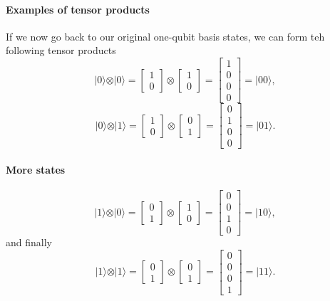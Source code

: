\paragraph{Examples of tensor products}
If we now go back to our original one-qubit basis states, we can form teh following tensor products
\[
\vert 0 \rangle \otimes \vert 0 \rangle = \begin{bmatrix} 1 \\ 0\end{bmatrix} \otimes \begin{bmatrix} 1 \\ 0\end{bmatrix} =\begin{bmatrix} 1 \\ 0 \\ 0 \\ 0 \end{bmatrix}=\vert 00 \rangle, 
\]
\[
\vert 0 \rangle \otimes \vert 1 \rangle = \begin{bmatrix} 1 \\ 0\end{bmatrix} \otimes \begin{bmatrix} 0 \\ 1\end{bmatrix} =\begin{bmatrix} 0 \\ 1 \\ 0 \\ 0 \end{bmatrix}=\vert 01 \rangle.
\]


\paragraph{More states}

\[
\vert 1 \rangle \otimes \vert 0 \rangle = \begin{bmatrix} 0 \\ 1\end{bmatrix} \otimes \begin{bmatrix} 1 \\ 0\end{bmatrix} =\begin{bmatrix} 0 \\ 0 \\ 1 \\ 0 \end{bmatrix}=\vert 10 \rangle, 
\]
and finally
\[
\vert 1 \rangle \otimes \vert 1 \rangle = \begin{bmatrix} 0 \\ 1\end{bmatrix} \otimes \begin{bmatrix} 0 \\ 1\end{bmatrix} =\begin{bmatrix} 0 \\ 0 \\ 0 \\ 1 \end{bmatrix}=\vert 11 \rangle. 
\]


